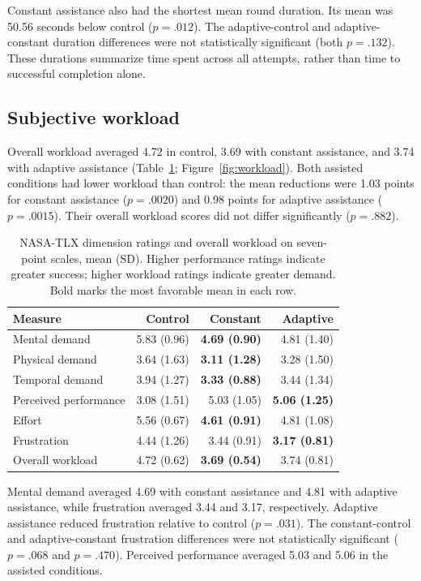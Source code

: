 \documentclass[sigconf,anonymous]{aamas}
\begin{document}
Constant assistance also had the shortest mean round duration. Its mean was 50.56 seconds below control ($p=.012$). The adaptive-control and adaptive-constant duration differences were not statistically significant (both $p=.132$). These durations summarize time spent across all attempts, rather than time to successful completion alone.


\subsection{Subjective workload}

Overall workload averaged 4.72 in control, 3.69 with constant assistance, and 3.74 with adaptive assistance (Table~\ref{tab:workload}; Figure~\ref{fig:workload}). Both assisted conditions had lower workload than control: the mean reductions were 1.03 points for constant assistance ($p=.0020$) and 0.98 points for adaptive assistance ($p=.0015$). Their overall workload scores did not differ significantly ($p=.882$).

\begin{table}[t]
\centering
\caption{NASA-TLX dimension ratings and overall workload on seven-point scales, mean (SD). Higher performance ratings indicate greater success; higher workload ratings indicate greater demand. Bold marks the most favorable mean in each row.}
\label{tab:workload}
\begingroup\small\setlength{\tabcolsep}{4pt}
\begin{tabular}{lrrr}
\toprule
Measure & Control & Constant & Adaptive \\
\midrule
Mental demand & 5.83 (0.96) & \textbf{4.69 (0.90)} & 4.81 (1.40) \\
Physical demand & 3.64 (1.63) & \textbf{3.11 (1.28)} & 3.28 (1.50) \\
Temporal demand & 3.94 (1.27) & \textbf{3.33 (0.88)} & 3.44 (1.34) \\
Perceived performance & 3.08 (1.51) & 5.03 (1.05) & \textbf{5.06 (1.25)} \\
Effort & 5.56 (0.67) & \textbf{4.61 (0.91)} & 4.81 (1.08) \\
Frustration & 4.44 (1.26) & 3.44 (0.91) & \textbf{3.17 (0.81)} \\
Overall workload & 4.72 (0.62) & \textbf{3.69 (0.54)} & 3.74 (0.81) \\
\bottomrule
\end{tabular}
\endgroup
\end{table}

Mental demand averaged 4.69 with constant assistance and 4.81 with adaptive assistance, while frustration averaged 3.44 and 3.17, respectively. Adaptive assistance reduced frustration relative to control ($p=.031$). The constant-control and adaptive-constant frustration differences were not statistically significant ($p=.068$ and $p=.470$). Perceived performance averaged 5.03 and 5.06 in the assisted conditions.
\end{document}
